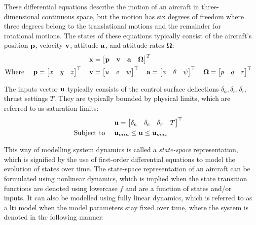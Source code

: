\documentclass[../report.tex]{subfiles}
\begin{document}
These differential equations describe the motion of an aircraft in three-dimensional continuous space, but the motion has six degrees of freedom where three degrees belong to the translational motions and the remainder for rotational motions. The states of these equations typically consist of the aircraft's position $\bold{p}$, velocity $\bold{v}$, attitude $\bold{a}$, and attitude rates $\boldsymbol{\Omega}$:
{\myfont
\begin{align*}
    \bold{x} &= \begin{bmatrix}
        \bold{p} & \bold{v} & \bold{a} & \boldsymbol{\Omega}
    \end{bmatrix}^T \\
    \text{Where } \quad \bold{p} = \begin{bmatrix} x & y & z\end{bmatrix}^{\top} \quad \bold{v} &= \begin{bmatrix}u & v & w \end{bmatrix}^{\top} \quad \bold{a} = \begin{bmatrix} \phi & \theta & \psi \end{bmatrix}^{\top} \quad \boldsymbol{\Omega} = \begin{bmatrix}p & q & r \end{bmatrix}^{\top}
\end{align*}
}

The inputs vector $\bold{u}$ typically consists of the control surface deflections $\delta_a, \delta_e, \delta_r$, thrust settings $T$. They are typically bounded by physical limits, which are referred to as saturation limits:
{\myfont
\begin{align*}
    &\bold{u} = \begin{bmatrix}
        \delta_a & \delta_e & \delta_r & T
    \end{bmatrix}^{\top} \\
    \text{Subject to } \quad &\bold{u}_{min} \leq \bold{u} \leq \bold{u}_{max}
\end{align*}
}

This way of modelling system dynamics is called a \textit{state-space} representation, which is signified by the use of first-order differential equations to model the evolution of states over time. The state-space representation of an aircraft can be formulated using nonlinear dynamics, which is implied when the state transition functions are denoted using lowercase $f$ and are a function of states and/or inputs. It can also be modelled using fully linear dynamics, which is referred to as a \ac{lti} model when the model parameters stay fixed over time, where the system is denoted in the following manner:
\end{document}
